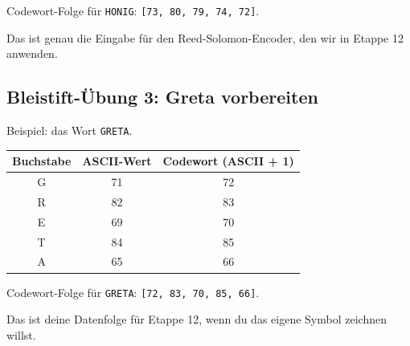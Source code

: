 Codewort-Folge für \texttt{HONIG}: \texttt{[73, 80, 79, 74, 72]}.

Das ist genau die Eingabe für den Reed-Solomon-Encoder, den wir in
Etappe 12 anwenden.

\subsection*{Bleistift-Übung 3: Greta vorbereiten}

Beispiel: das Wort \texttt{GRETA}.

\begin{center}
\small
\begin{tabular}{c c c}
\toprule
Buchstabe & ASCII-Wert & Codewort (ASCII + 1) \\
\midrule
G & 71 & 72 \\
R & 82 & 83 \\
E & 69 & 70 \\
T & 84 & 85 \\
A & 65 & 66 \\
\bottomrule
\end{tabular}
\end{center}

Codewort-Folge für \texttt{GRETA}: \texttt{[72, 83, 70, 85, 66]}.

Das ist deine Datenfolge für Etappe 12, wenn du das eigene Symbol
zeichnen willst.
